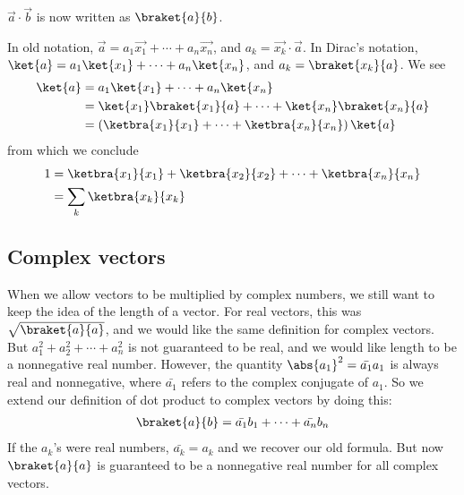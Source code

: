 \documentclass[12pt, oneside, letterpaper, fleqn]{article}
\begin{document}
$\vec{a} \cdot \vec{b}$ is now written as $\braket{a}{b}$.

In old notation, $\vec{a} = a_1\vec{x_1} +\dotsb+ a_n\vec{x_n}$, and
$a_k = \vec{x_k} \cdot \vec{a}$. In Dirac's notation, $\ket{a} =
a_1\ket{x_1} +\dotsb+ a_n\ket{x_n}$, and $a_k = \braket{x_k}{a}$. We see
\begin{align*}
\ket{a} &= a_1\ket{x_1} +\dotsb+ a_n\ket{x_n}\\
&= \ket{x_1}\braket{x_1}{a} +\dotsb+ \ket{x_n}\braket{x_n}{a}\\
&= \left(\ketbra{x_1}{x_1} +\dotsb+ \ketbra{x_n}{x_n}\right)\ket{a}
\end{align*}
from which we conclude
\begin{align}\begin{split}\label{eq:finite_id}
1 &= \ketbra{x_1}{x_1} + \ketbra{x_2}{x_2} +\dotsb+ \ketbra{x_n}{x_n}\\
&= \sum_k \ketbra{x_k}{x_k}
\end{split}\end{align}

\subsection{Complex vectors}
When we allow vectors to be multiplied by complex numbers, we still want
to keep the idea of the length of a vector. For real vectors, this was
$\sqrt{\braket{a}{a}}$, and we would like the same definition for
complex vectors. But $a_1^2 + a_2^2 + \dotsb + a_n^2$ is not guaranteed
to be real, and we would like length to be a nonnegative real number.
However, the quantity $\abs{a_1}^2 = \bar{a_1}a_1$ is always real and
nonnegative, where $\bar{a_1}$ refers to the complex conjugate of $a_1$. So
we extend our definition of dot product to complex vectors by doing
this:
\begin{align}
\braket{a}{b} = \bar{a_1}b_1 + \dotsb + \bar{a_n}b_n
\end{align}
If the $a_k$'s were real numbers, $\bar{a_k} = a_k$ and we recover our
old formula. But now $\braket{a}{a}$ is guaranteed to be a nonnegative
real number for all complex vectors.
\end{document}
